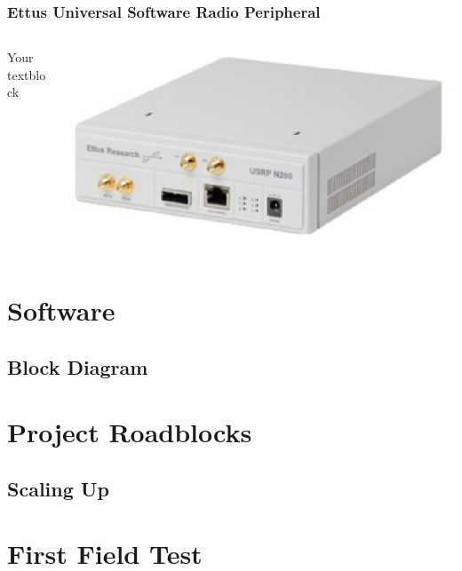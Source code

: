 \documentclass{beamer}
\begin{document}
\begin{frame}
\frametitle{Ettus Universal Software Radio Peripheral}
  \begin{columns}[T]
    \begin{column}{.5\textwidth}
     \begin{block}{Your textblock}
    \end{block}
    \end{column}
    \begin{column}{.5\textwidth}
    \begin{block}{}
    \includegraphics[width=\textwidth]{n200.eps}
    \end{block}
    \end{column}
  \end{columns}
\end{frame}

\section{Software}

\subsection{Block Diagram}

\section{Project Roadblocks}

\subsection{Scaling Up}

\section{First Field Test}
\end{document}

